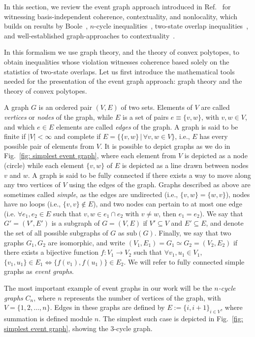 \documentclass[letterpaper,onecolumn,12pt,accepted=2024-01-17]{article}
\begin{document}
{ In this section, we review the} event graph approach introduced in Ref.~\cite{wagner2022inequalities} for witnessing basis-independent coherence, contextuality, and nonlocality, which builds on  results by Boole~\cite{Boole1854}, $n$-cycle inequalities~\cite{araujo2013all},  two-state overlap inequalities~\cite{galvaobroad2020quantumandclassical}, and well-established graph-approaches to contextuality~\cite{amaral2018graph,cabello2014graph}. {In this formalism we use graph theory, and the theory of convex polytopes, to obtain inequalities whose violation witnesses coherence based solely on the statistics of two-state overlaps. Let us first introduce the mathematical tools needed for the presentation of the event graph approach: graph theory and the theory of convex polytopes. 

A graph $G$ is an ordered pair $(V,E)$ of two sets. Elements of $V$ are called \textit{vertices} or \textit{nodes} of the graph, while  $E$ is a set of pairs $e \equiv \{v,w\}$, with $v,w \in V$, and which  $e \in E$ elements are called \textit{edges} of the graph. A graph is said to be finite if $|V|<\infty$ and complete if $E = \{\{v,w\}\,|\, \forall v,w \in V\}$, i.e., $E$ has every possible pair of elements from $V$. It is possible to depict graphs as we do in Fig.~\ref{fig: simplest event graph}, where each element from $V$ is depicted as a node (circle) while each element $\{v,w\}$ of $E$ is depicted as a line drawn between nodes $v$ and $w$. A graph is said to be fully connected if there exists a way to move along any two vertices of $V$ using the edges of the graph. Graphs described as above are sometimes called \textit{simple}, as the edges are undirected (i.e., $\{v,w\} = \{w,v\}$), nodes have no loops (i.e., $\{v,v\} \notin E$), and two nodes can pertain to at most one edge (i.e. $\forall e_1,e_2 \in E$ such that  $v,w \in e_1 \cap e_2$ with $v \neq w$, then $e_1 = e_2$). We say that $G' = (V',E')$ is a subgraph of $G = (V,E)$ if $V' \subseteq V$ and $E' \subseteq E$, and denote the set of all possible subgraphs of $G$ as $\text{sub}(G)$. Finally, we say that two graphs $G_1,G_2$ are isomorphic, and write $(V_1,E_1) = G_1 \simeq G_2 = (V_2,E_2)$ if there exists a bijective function $f: V_1 \to V_2$ such that $\forall v_1,u_1 \in V_1$, $\{v_1,u_1\} \in E_1 \iff \{f(v_1),f(u_1)\} \in E_2$.  We will refer to fully connected simple graphs as \textit{event graphs}.}

{ The most important example of event graphs in our work will be the \textit{$n$-cycle graphs} $C_n$, where $n$ represents the number of vertices of the graph, with $V = \{1,2,\dots,n\}$. Edges in these graphs are defined by $E := \{i,i+1\}_{i \in V}$, where summation is defined module $n$. The simplest such case is depicted in Fig.~\ref{fig: simplest event graph}, showing the $3$-cycle graph. }
\end{document}
